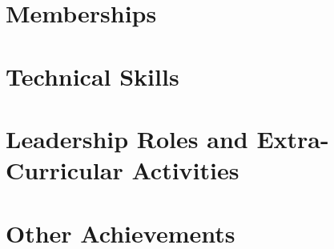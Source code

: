 \documentclass[margin,line]{res}
\begin{document}
\begin{resume}
\section{\sc Memberships}
    
\section{\sc Technical Skills}
    
\section{\sc Leadership Roles and Extra-Curricular Activities}
    
\section{\sc Other Achievements}
    
%     
\end{resume}
\end{document}

